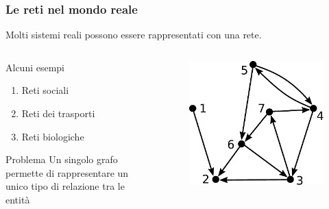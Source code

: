 \begin{frame}
    \frametitle{Le reti nel mondo reale}
    Molti sistemi reali possono essere rappresentati con una rete.
    \begin{columns}
        \begin{column}{0.4\textwidth}
            \begin{exampleblock}{Alcuni esempi}
                \begin{enumerate}
                    \item Reti sociali
                    \item Reti dei trasporti
                    \item Reti biologiche
                \end{enumerate}
            \end{exampleblock}
            \begin{alertblock}{Problema}
                Un singolo \alert{grafo} permette di rappresentare un unico tipo di relazione tra le entità
            \end{alertblock}
        \end{column}
        \begin{column}{0.4\textwidth}
            \begin{figure}
                \centering
                \includegraphics[width=\textwidth]{img/graph.pdf}
            \end{figure}
        \end{column}    
    \end{columns}
   
\end{frame}


